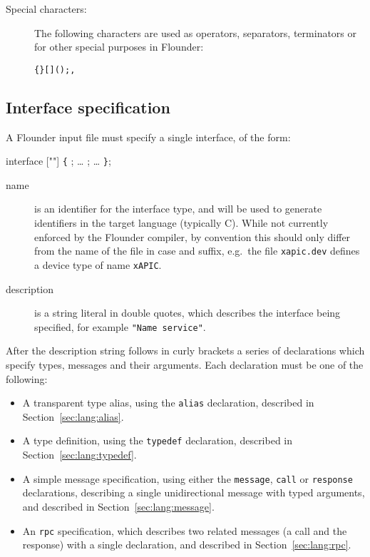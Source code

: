 \documentclass[a4paper,twoside]{report} %
\begin{document}
\begin{description}
\item[Special characters:] The following characters are used as operators,
  separators, terminators or for other special purposes in Flounder:
\begin{alltt}
  \{ \} [ ] ( ) ; ,
\end{alltt}

\end{description}


\subsection{Interface specification}

A Flounder input file must specify a single interface, of the form:

\begin{syntax}
interface  [""]
\verb+{+
  ;
  \ldots
  ;
  \ldots
\verb+}+;
\end{syntax}

\begin{description}
\item[name] is an identifier for the interface type, and will be used to
  generate identifiers in the target language (typically C).  While
  not currently enforced by the Flounder compiler, by
  convention this should only differ from the name of the file in case
  and suffix, e.g.\ the file \texttt{xapic.dev} defines a device type
  of name \texttt{xAPIC}. 

\item[description] is a string literal in double quotes, which
  describes the interface being specified, for example
  \texttt{"Name service"}.
\end{description}

After the description string follows in curly brackets a series of
declarations which specify types, messages and their arguments.   Each
declaration must be one of the following:

\begin{itemize}

  \item A transparent type alias, using the \texttt{alias} declaration,
    described in Section~\ref{sec:lang:alias}.

  \item A type definition, using the \texttt{typedef} declaration,
    described in Section~\ref{sec:lang:typedef}.

  \item A simple message specification, using either the \texttt{message},
    \texttt{call} or \texttt{response} declarations, describing a
    single unidirectional message with typed arguments,
    and described in Section~\ref{sec:lang:message}.

  \item An \texttt{rpc} specification, which describes two related
    messages (a call and the response) with a single declaration,
    and described in Section~\ref{sec:lang:rpc}.

\end{itemize}
\end{document}
